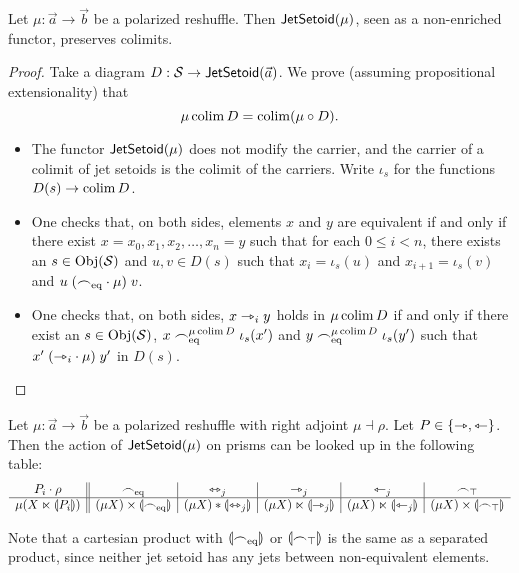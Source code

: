 \documentclass[a4paper]{memoir}
\begin{document}
\begin{lemma} \label{thm:poresh-jetsetoid-cocontinuous}
	Let $\mu : \vec a \to \vec b$ be a polarized reshuffle.
	Then $\mathsf{JetSetoid}(\mu)$, seen as a non-enriched functor, preserves colimits.
\end{lemma}
\begin{proof}
	Take a diagram $D : \mathcal{S} \to \mathsf{JetSetoid}(\vec a)$.
	We prove (assuming propositional extensionality) that
	\[
		\mu \operatorname*{colim} D = \operatorname*{colim} (\mu  \circ D).
	\]
	\begin{itemize}
		\item The functor $\mathsf{JetSetoid}(\mu)$ does not modify the carrier, and the carrier of a colimit of jet setoids is the colimit of the carriers.
		Write $\iota_s$ for the functions $D(s) \to \operatorname*{colim} D$.
		\item One checks that, on both sides, elements $x$ and $y$ are equivalent if and only if there exist $x = x_0, x_1, x_2, \ldots, x_n = y$ such that for each $0 \leq i < n$, there exists an $s \in \mathrm{Obj}(\mathcal{S})$ and $u, v \in D(s)$ such that $x_i = \iota_s(u)$ and $x_{i+1} = \iota_s(v)$ and $u \mathrel{({\frown}_{{\mathrm{eq}}} \cdot \mu)} v$.
		\item One checks that, on both sides, $x \rightarrowtriangle_i y$ holds in $\mu \operatorname*{colim} D$ if and only if there exist an $s \in \mathrm{Obj}(\mathcal{S})$, $x \frown_{{\mathrm{eq}}}^{\mu \operatorname*{colim} D} \iota_s(x')$ and $y \frown_{{\mathrm{eq}}}^{\mu \operatorname*{colim} D} \iota_s(y')$ such that $x' \mathrel{({\rightarrowtriangle}_i \cdot \mu)} y'$ in $D(s)$. \qedhere
	\end{itemize}
\end{proof}
\begin{proposition} \label{thm:poresh-jetsetoid-prism-commut}
	Let $\mu : \vec a \to \vec b$ be a polarized reshuffle with right adjoint $\mu \dashv \rho$.
	Let $P \in \mathopen{}\left\{ {\rightarrowtriangle}, {\leftarrowtriangle} \right\}\mathclose{}$.
	Then the action of $\mathsf{JetSetoid}(\mu)$ on prisms can be looked up in the following table:
	\[
		\begin{array}{c || c | c | c | c | c}
			P_i \cdot \rho 
			& {\frown}_{{\mathrm{eq}}} 
			& {\leftrightarrowtriangle}_j
			& {\rightarrowtriangle}_j
			& {\leftarrowtriangle}_j 
			& {\frown}_\top 
			\\ \hline
			\mu(X \ltimes {\llparenthesis P_i \rrparenthesis})
			& (\mu X) \times {\llparenthesis {\frown}_{{\mathrm{eq}}}\rrparenthesis}
			& (\mu X) * {\llparenthesis {\leftrightarrowtriangle}_j \rrparenthesis}
			& (\mu X) \ltimes {\llparenthesis {\rightarrowtriangle}_j \rrparenthesis}
			& (\mu X) \ltimes {\llparenthesis {\leftarrowtriangle}_j \rrparenthesis}
			& (\mu X) \times {\llparenthesis {\frown}_\top\rrparenthesis}
		\end{array}
	\]
\end{proposition}
Note that a cartesian product with ${\llparenthesis {\frown}_{{\mathrm{eq}}} \rrparenthesis}$ or ${\llparenthesis {\frown}_\top \rrparenthesis}$ is the same as a separated product, since neither jet setoid has any jets between non-equivalent elements.
\end{document}
